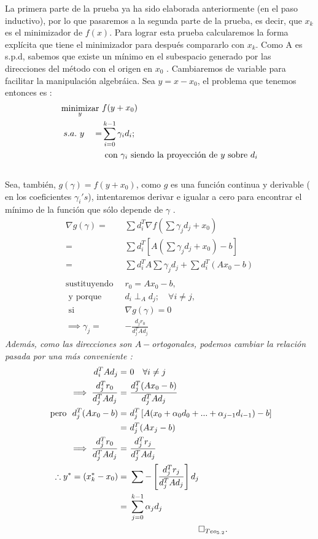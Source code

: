 \documentclass[12pt]{article}
\newcommand{\beas}{\begin{eqnarray*}}
\newcommand{\eeas}{\end{eqnarray*}}
\begin{document}
\begin{enumerate}
 \noindent La primera parte de la prueba ya ha sido elaborada anteriormente (en el paso inductivo), por lo que pasaremos a la segunda parte de la prueba, es decir, que $x_k$ es el minimizador de $f(x)$. 
Para lograr esta prueba calcularemos la forma expl\'icita que tiene el minimizador para despu\'es compararlo con $x_k$.
Como A es s.p.d, sabemos que existe un m\'inimo en el subespacio generado por las direcciones del m\'etodo con el origen en $x_0$ . Cambiaremos de variable para facilitar la manipulaci\'on algebr\'aica. Sea $y = x - x_0$, el problema que tenemos entonces es : \\
 \beas  
  \stackrel{\mbox{minimizar}}{ {}_y }\ &  \raisebox{1.0ex}{$\displaystyle f(y+x_0)$}\\
    s.a. \ y\quad = & \sum_{i=0}^{k-1}\gamma_id_i ; \\ \quad &\text{ con } \gamma_i \text{ siendo la proyecci\'on de } y \text{ sobre } d_i 
\eeas \\
Sea, tambi\'en, $g(\gamma) = f(y + x_0)$, como $g$ es una funci\'on continua y derivable ( en los coeficientes $\gamma_i 's $), intentaremos derivar e igualar a cero para encontrar el m\'inimo de la funci\'on que s\'olo depende de $\gamma$ . 
\beas
\nabla g(\gamma) =\ & \sum d_i^T\nabla f(\sum \gamma_jd_j + x_0) \\
=\ & \sum d_i^T \left[A(\sum \gamma_jd_j+ x_0) - b\right]\\
=\ & \sum d_i^TA\sum \gamma_jd_j + \sum d_i^T (Ax_0 - b)\\ \\
\text{sustituyendo } \ & r_0 = Ax_0-b , \\
\text{ y porque }\  &d_i\perp_Ad_j ;\quad \forall i \ne j , \\ 
\text{ si } \ & \nabla g(\gamma) = 0\\ 
\implies \gamma_j =\ & -\frac{d_jr_0}{d_j^TAd_j} 
\eeas
  {\it Adem\'as, como las direcciones son $A-$ortogonales, podemos cambiar la relaci\'on pasada por una m\'as conveniente :}\\
  \beas
  d_i^TAd_j =\  &0 \quad \forall i\ne j \\ 
  \implies \frac{d_j^Tr_0}{d_j^TAd_j} =\ &\frac{d_j^T(Ax_0-b)}{d_j^TAd_j} \\
  \text{ pero } \ d_j^T(Ax_0 - b) =\ &d_j^T\left[A(x_0 + \alpha_0d_0 + ... + \alpha_{j-1}d_{i-1}) - b\right]\\
  =\ &d_j^T(Ax_j - b)\\ 
  \implies \frac{d_j^Tr_0}{d_j^TAd_j} =\ &\frac{d_j^Tr_j}{d_j^TAd_j}\\
  \therefore y^* = (x_k^*- x_0) =\ &\sum-\left[\frac{d_j^Tr_j}{d_j^TAd_j}\right] d_j\\
  =\ &\sum_{j=0}^{k-1} \alpha_jd_j \\ &\quad \quad\ \ \ \ \ \ \ \ \ \ \ \ \qed_{Teo_{5.2}} .\\ \\
  \eeas
  

\end{enumerate}
\end{document}
